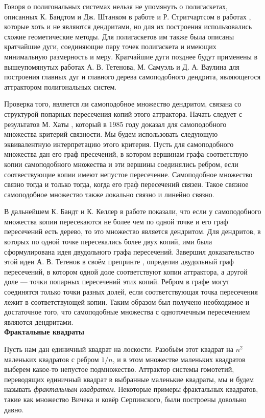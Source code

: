 Говоря о полигональных системах нельзя не упомянуть о полигаскетах, описанных К. Бандтом и Дж. Штанком в работе \cite{SSS6} и Р. Стритчартсом в работах \cite{strich1999, Strichartz1999}, которые хоть и не являются дендритами, но для их построения использовались схожие геометические методы.
Для полигаскетов им также была описаны кратчайшие дуги, соединяющие пару точек полигаскета и имеющих минимальную размерность и меру.
Кратчайшие дуги позднее будут применены в вышеупомянутых работах \cite{TSV2017, STV2017} А. В. Тетенова, М. Самуэль и Д. А. Ваулина для построения главных дуг и главного дерева самоподобного дендрита, являющегося аттрактором полигональных систем.

Проверка того, является ли самоподобное множество дендритом, связана со структурой попарных пересечения копий этого аттрактора.
Начать следует с результатов М. Хаты \cite{Hata1985}, который в 1985 году доказал для самоподобного множества критерий связности.
Мы будем использовать следующую эквивалентную интерпретацию этого критерия.
Пусть для самоподобного множества дан его граф пресечений, в котором вершинам графа соответствую копии самоподобного множества и эти вершины соединялись ребром, если соотвествующие копии имеют непустое пересечение.
Самоподобное множество связно тогда и только тогда, когда его граф пересечений связен.
Такое связное самоподобное множество также локально связно и линейно связно.

В дальнейшем К. Бандт и К. Келлер в работе \cite{SSS2} показали, что если у самоподобного множества копии пересекаются не более чем по одной точке и его граф пересечений есть дерево, то это множество является дендритом. Для дендритов, в которых по одной точке пересекались более двух копий, ими была сформулирована идея двудольного графа пересечений. 
Завершил доказательство этой идеи А. В. Тетенов в своём препринте \cite{FIP}, определив двудольный граф пересечений, в котором одной доле соответствуют копии аттрактора, а другой доле --- точки попарных пересечений этих копий. Ребром в графе могут соединятся только точки разных долей, если соответствующая точка пересечения лежит в соответствующей копии.
Таким образом был получено необходимое и достаточное того, что самоподобные множества с одноточечным пересечением являются дендритами.\\

{\bf Фрактальные квадраты}

Пусть нам дан единичный квадрат на лоскости.
Разобьём этот квадрат на $n^2$ маленьких квадратов с ребром $1/n$, и в этом множестве маленьких квадратов выберем какое-то непустое подмножество.
Аттрактор системы гомотетий, переводящих единичный квадрат в выбранные маленькие квадраты, мы и будем называть {\em фрактальным квадратом}.
Некоторые примеры фрактальных квадратов, такие как множество Вичека и ковёр Серпинского, были построены довольно давно.

